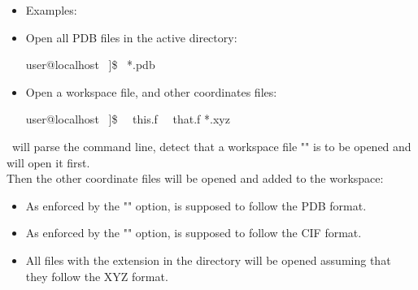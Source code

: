 \begin{itemize}
\item Examples:
\item[] Open all PDB files in the active directory: 
\begin{scri}{15}
user@localhost ~]\$ \atoc\ *.pdb
\end{scri}
\item[] Open a workspace file, and other coordinates files: 
\begin{scri}{15}
user@localhost ~]\$ \atoc\ \pdb\ this.f \fawf\ \cif\ that.f *.xyz
\end{scri}
\end{itemize}
\atomes\ will parse the command line, detect that a workspace file "\fawf" is to be opened and will open it first. \\
Then the other coordinate files will be opened and added to the workspace: 
\begin{itemize}
\item As enforced by the "\pdb" option,  is supposed to follow the PDB format.
\item As enforced by the "\cif" option,  is supposed to follow the CIF format.
\item All files with the  extension in the directory will be opened assuming that they follow the XYZ format. 
\end{itemize}
